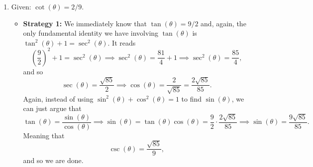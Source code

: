 \documentclass{ximera}
\begin{document}
\begin{example}
\begin{enumerate}[label=\alph*.]
  \item Given: $\cot(\theta) = 2/9$.

    \begin{explanation}
      \begin{itemize}
      \item {\bf Strategy 1:} We immediately know that $\tan(\theta) = 9/2$ and, again, the only fundamental identity we have involving $\tan(\theta)$ is $\tan^2(\theta)+1=\sec^2(\theta)$. It reads $$\left(\frac{9}{2}\right)^2 + 1 = \sec^2(\theta) \implies \sec^2(\theta) = \frac{81}{4} + 1 \implies \sec^2(\theta) = \frac{85}{4},$$and so $$\sec(\theta) = \frac{\sqrt{85}}{2} \implies \cos(\theta) = \frac{2}{\sqrt{85}} = \frac{2\sqrt{85}}{85}.$$Again, instead of using $\sin^2(\theta)+\cos^2(\theta)=1$ to find $\sin(\theta)$, we can just argue that $$\tan(\theta) = \frac{\sin(\theta)}{\cos(\theta)} \implies \sin(\theta) = \tan(\theta) \cos(\theta)= \frac{9}{2}\cdot \frac{2\sqrt{85}}{85} \implies \sin(\theta) = \frac{9\sqrt{85}}{85}.$$Meaning that $$\csc(\theta) = \frac{\sqrt{85}}{9},$$and so we are done.


\end{itemize}
\end{explanation}
\end{enumerate}
\end{example}
\end{document}
